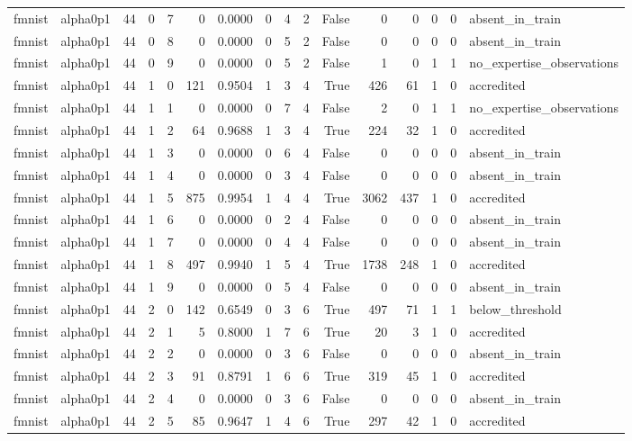 \begin{tabular}{llrrrrrrrrrrrrrl}
fmnist & alpha0p1 & 44 & 0 & 7 & 0 & 0.0000 & 0 & 4 & 2 & False & 0 & 0 & 0 & 0 & absent\_in\_train \\
fmnist & alpha0p1 & 44 & 0 & 8 & 0 & 0.0000 & 0 & 5 & 2 & False & 0 & 0 & 0 & 0 & absent\_in\_train \\
fmnist & alpha0p1 & 44 & 0 & 9 & 0 & 0.0000 & 0 & 5 & 2 & False & 1 & 0 & 1 & 1 & no\_expertise\_observations \\
fmnist & alpha0p1 & 44 & 1 & 0 & 121 & 0.9504 & 1 & 3 & 4 & True & 426 & 61 & 1 & 0 & accredited \\
fmnist & alpha0p1 & 44 & 1 & 1 & 0 & 0.0000 & 0 & 7 & 4 & False & 2 & 0 & 1 & 1 & no\_expertise\_observations \\
fmnist & alpha0p1 & 44 & 1 & 2 & 64 & 0.9688 & 1 & 3 & 4 & True & 224 & 32 & 1 & 0 & accredited \\
fmnist & alpha0p1 & 44 & 1 & 3 & 0 & 0.0000 & 0 & 6 & 4 & False & 0 & 0 & 0 & 0 & absent\_in\_train \\
fmnist & alpha0p1 & 44 & 1 & 4 & 0 & 0.0000 & 0 & 3 & 4 & False & 0 & 0 & 0 & 0 & absent\_in\_train \\
fmnist & alpha0p1 & 44 & 1 & 5 & 875 & 0.9954 & 1 & 4 & 4 & True & 3062 & 437 & 1 & 0 & accredited \\
fmnist & alpha0p1 & 44 & 1 & 6 & 0 & 0.0000 & 0 & 2 & 4 & False & 0 & 0 & 0 & 0 & absent\_in\_train \\
fmnist & alpha0p1 & 44 & 1 & 7 & 0 & 0.0000 & 0 & 4 & 4 & False & 0 & 0 & 0 & 0 & absent\_in\_train \\
fmnist & alpha0p1 & 44 & 1 & 8 & 497 & 0.9940 & 1 & 5 & 4 & True & 1738 & 248 & 1 & 0 & accredited \\
fmnist & alpha0p1 & 44 & 1 & 9 & 0 & 0.0000 & 0 & 5 & 4 & False & 0 & 0 & 0 & 0 & absent\_in\_train \\
fmnist & alpha0p1 & 44 & 2 & 0 & 142 & 0.6549 & 0 & 3 & 6 & True & 497 & 71 & 1 & 1 & below\_threshold \\
fmnist & alpha0p1 & 44 & 2 & 1 & 5 & 0.8000 & 1 & 7 & 6 & True & 20 & 3 & 1 & 0 & accredited \\
fmnist & alpha0p1 & 44 & 2 & 2 & 0 & 0.0000 & 0 & 3 & 6 & False & 0 & 0 & 0 & 0 & absent\_in\_train \\
fmnist & alpha0p1 & 44 & 2 & 3 & 91 & 0.8791 & 1 & 6 & 6 & True & 319 & 45 & 1 & 0 & accredited \\
fmnist & alpha0p1 & 44 & 2 & 4 & 0 & 0.0000 & 0 & 3 & 6 & False & 0 & 0 & 0 & 0 & absent\_in\_train \\
fmnist & alpha0p1 & 44 & 2 & 5 & 85 & 0.9647 & 1 & 4 & 6 & True & 297 & 42 & 1 & 0 & accredited \\

\end{tabular}
